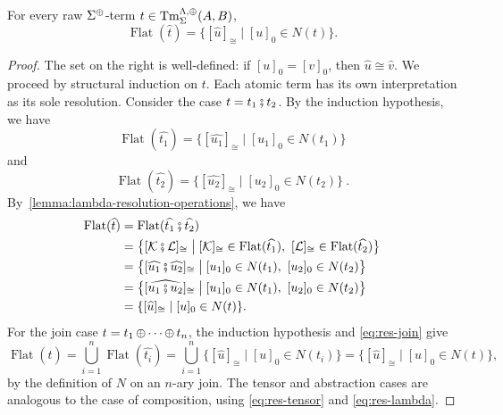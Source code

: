 \begin{lemma}
\label{lemma:lambda-resolution-interpretation}
For every raw $\Sigma^{\operatorname{\oplus}}$-term $t \in \operatorname{Tm}^{\Lambda,\operatorname{\oplus}}_{\Sigma}(A,B)$,
\[
 \operatorname{Flat}(\widehat t)
 =\{[\widehat u]_{\cong}\mid[u]_0\in N(t)\}.
\]
\end{lemma}
\begin{proof}
The set on the right is well-defined: if $[u]_0 = [v]_0$, then $\widehat{u} \cong \widehat{v}$.
We proceed by structural induction on $t$.
Each atomic term has its own interpretation
as its sole resolution.
Consider the case $t = t_1 \fatsemi t_2$.
By the induction hypothesis, we have
\[
\operatorname{Flat}(\widehat{t_1}) = \{[\widehat{u_1}]_{\cong} \mid [u_1]_0 \in N(t_1)\}
\]
and
\[
\operatorname{Flat}(\widehat{t_2}) = \{[\widehat{u_2}]_{\cong} \mid [u_2]_0 \in N(t_2)\}~.
\]
By~\cref{lemma:lambda-resolution-operations}, we have 
\begin{align*}
  \operatorname{Flat}(\widehat t)
  &=
  \operatorname{Flat}
  (\widehat{t_1}\fatsemi\widehat{t_2})\\
  &=
  \bigl\{
    [\mathcal K\fatsemi\mathcal L]_{\cong}
    \mathrel{\big|}
    [\mathcal K]_{\cong}
      \in\operatorname{Flat}(\widehat{t_1}),
    \
    [\mathcal L]_{\cong}
      \in\operatorname{Flat}(\widehat{t_2})
  \bigr\}\\
  &=
  \bigl\{
    [\widehat{u_1}\fatsemi\widehat{u_2}]_{\cong}
    \mathrel{\big|}
    [u_1]_0\in N(t_1),
    \
    [u_2]_0\in N(t_2)
  \bigr\}\\
  &=
  \bigl\{
    [\widehat{u_1\fatsemi u_2}]_{\cong}
    \mathrel{\big|}
    [u_1]_0\in N(t_1),
    \
    [u_2]_0\in N(t_2)
  \bigr\}\\
  &=
  \{[\widehat u]_{\cong}\mid[u]_0\in N(t)\}.
\end{align*}
For the join case $t=t_1\operatorname{\oplus}\cdots\operatorname{\oplus} t_n$, the induction hypothesis
and \eqref{eq:res-join} give
\[
  \operatorname{Flat}(\widehat t)
  =
  \bigcup_{i=1}^{n}\operatorname{Flat}(\widehat{t_i})
  =
  \bigcup_{i=1}^{n}
  \{[\widehat u]_{\cong}\mid[u]_0\in N(t_i)\}
  =
  \{[\widehat u]_{\cong}\mid[u]_0\in N(t)\},
\]
by the definition of $N$ on an $n$-ary join. The tensor and abstraction
cases are analogous to the case of composition, using
\eqref{eq:res-tensor} and \eqref{eq:res-lambda}.
\end{proof}

